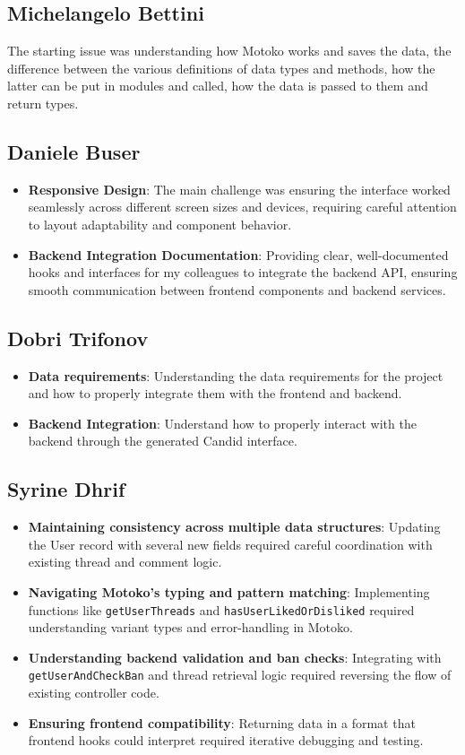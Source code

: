 \documentclass[a4paper]{article}
\begin{document}
	\subsection*{Michelangelo Bettini}
	The starting issue was understanding how Motoko works and saves the data, the
	difference between the various definitions of data types and methods, how the
	latter can be put in modules and called, how the data is passed to them and
	return types.
	
	\subsection*{Daniele Buser}
	\begin{itemize}
		\item \textbf{Responsive Design}: The main challenge was ensuring the interface worked seamlessly across different screen sizes and devices, requiring careful attention to layout adaptability and component behavior.
		\item \textbf{Backend Integration Documentation}: Providing clear, well-documented hooks and interfaces for my colleagues to integrate the backend API, ensuring smooth communication between frontend components and backend services.
	\end{itemize}
	
	\subsection*{Dobri Trifonov}
	\begin{itemize}
		\item \textbf{Data requirements}: Understanding the data requirements for the project and how to properly
		integrate them with the frontend and backend.
		\item \textbf{Backend Integration}: Understand how to properly interact with the backend through the generated Candid interface.
	\end{itemize}
	
	\subsection*{Syrine Dhrif}
	\begin{itemize}
		\item \textbf{Maintaining consistency across multiple data structures}: Updating the User record with several new fields required careful coordination with existing thread and comment logic.
		\item \textbf{Navigating Motoko’s typing and pattern matching}: Implementing functions like \texttt{getUserThreads} and \texttt{hasUserLikedOrDisliked} required understanding variant types and error-handling in Motoko.
		\item \textbf{Understanding backend validation and ban checks}: Integrating with \texttt{getUserAndCheckBan} and thread retrieval logic required reversing the flow of existing controller code.
		\item \textbf{Ensuring frontend compatibility}: Returning data in a format that frontend hooks could interpret required iterative debugging and testing.
	\end{itemize}
	
\end{document}
